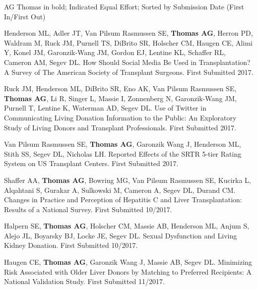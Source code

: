 \documentclass[10pt]{article}
\begin{document}
  AG Thomas in bold; \textbf{\dag} Indicated Equal Effort;
  Sorted by Submission Date (First In/First Out)

\vspace{2mm}

\begin{bibenum}

\item Henderson ML, Adler JT, Van Pilsum Rasmussen SE, \textbf{Thomas AG},
  Herron PD, Waldram M, Ruck JM, Purnell TS, DiBrito SR, Holscher CM,
  Haugen CE, Alimi Y, Konel JM, Garonzik-Wang JM, Gordon EJ,
  Lentine KL, Schaffer RL, Cameron AM, Segev DL.
  How Should Social Media Be Used in Transplantation?
  A Survey of The American Society of Transplant Surgeons.
  First Submitted 2017.

\item Ruck JM\dag, Henderson ML\dag, DiBrito SR, Eno AK, Van Pilsum Rasmussen SE,
  \textbf{Thomas AG}, Li R, Singer L, Massie I, Zonnenberg N,
  Garonzik-Wang JM, Purnell T, Lentine K, Waterman AD, Segev DL.
  Use of Twitter in Communicating Living Donation Information to the Public:
  An Exploratory Study of Living Donors and Transplant Professionals.
  First Submitted 2017.

\item Van Pilsum Rasmussen SE, \textbf{Thomas AG}, Garonzik Wang J,
  Henderson ML, Stith SS, Segev DL, Nicholas LH. Reported Effects
  of the SRTR 5-tier Rating System on US Transplant Centers.
  First Submitted 2017.

\item Shaffer AA, \textbf{Thomas AG}, Bowring MG, Van Pilsum Rasmussen SE,
  Kucirka L, Alqahtani S, Gurakar A, Sulkowski M, Cameron A,
  Segev DL, Durand CM. Changes in Practice and Perception of Hepatitis
  C and Liver Transplantation: Results of a National Survey.
  First Submitted 10/2017.

\item Halpern SE, \textbf{Thomas AG}, Holscher CM, Massie AB, Henderson ML,
  Anjum S, Alejo JL, Boyarsky BJ, Locke JE, Segev DL. Sexual Dysfunction
  and Living Kidney Donation.
  First Submitted 10/2017.

\item Haugen CE, \textbf{Thomas AG}, Garonzik Wang J, Massie AB,
  Segev DL. Minimizing Risk Associated with Older Liver Donors
  by Matching to Preferred Recipients: A National Validation Study.
  First Submitted 11/2017.


\end{bibenum}
\end{document}
